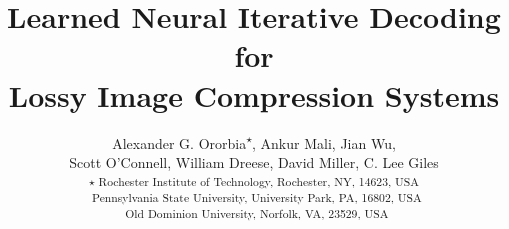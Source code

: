 \documentclass[smallabstract,smallcaptions]{dccpaper}
\begin{document}
\title{\bf Learned Neural Iterative Decoding for \\Lossy Image Compression Systems}
\author{Alexander G. Ororbia\textsuperscript{$\star$},
Ankur Mali\textsuperscript{\textdagger},
Jian Wu\textsuperscript{\textdaggerdbl},\\
Scott O'Connell\textsuperscript{\textdagger},
William Dreese\textsuperscript{\textdagger},
David Miller\textsuperscript{\textdagger},
C. Lee Giles\textsuperscript{\textdagger}\\ [0.5em]
\textsuperscript{$\star$ Rochester Institute of Technology, Rochester, NY, 14623, USA}\\
\textsuperscript{\textdagger\ Pennsylvania State University, University Park, PA, 16802, USA}\\
\textsuperscript{\textdaggerdbl\ Old Dominion University, Norfolk, VA, 23529, USA}
}
\maketitle
\thispagestyle{empty}
\setcounter{page}{1}
\end{document}

